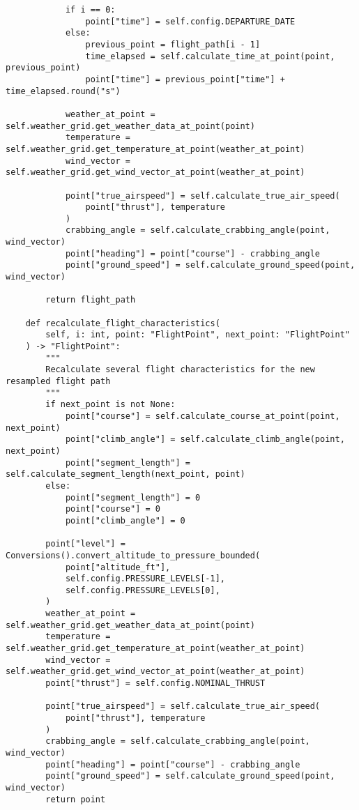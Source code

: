 \begin{verbatim}
            if i == 0:
                point["time"] = self.config.DEPARTURE_DATE
            else:
                previous_point = flight_path[i - 1]
                time_elapsed = self.calculate_time_at_point(point, previous_point)
                point["time"] = previous_point["time"] + time_elapsed.round("s")

            weather_at_point = self.weather_grid.get_weather_data_at_point(point)
            temperature = self.weather_grid.get_temperature_at_point(weather_at_point)
            wind_vector = self.weather_grid.get_wind_vector_at_point(weather_at_point)

            point["true_airspeed"] = self.calculate_true_air_speed(
                point["thrust"], temperature
            )
            crabbing_angle = self.calculate_crabbing_angle(point, wind_vector)
            point["heading"] = point["course"] - crabbing_angle
            point["ground_speed"] = self.calculate_ground_speed(point, wind_vector)

        return flight_path

    def recalculate_flight_characteristics(
        self, i: int, point: "FlightPoint", next_point: "FlightPoint"
    ) -> "FlightPoint":
        """
        Recalculate several flight characteristics for the new resampled flight path
        """
        if next_point is not None:
            point["course"] = self.calculate_course_at_point(point, next_point)
            point["climb_angle"] = self.calculate_climb_angle(point, next_point)
            point["segment_length"] = self.calculate_segment_length(next_point, point)
        else:
            point["segment_length"] = 0
            point["course"] = 0
            point["climb_angle"] = 0

        point["level"] = Conversions().convert_altitude_to_pressure_bounded(
            point["altitude_ft"],
            self.config.PRESSURE_LEVELS[-1],
            self.config.PRESSURE_LEVELS[0],
        )
        weather_at_point = self.weather_grid.get_weather_data_at_point(point)
        temperature = self.weather_grid.get_temperature_at_point(weather_at_point)
        wind_vector = self.weather_grid.get_wind_vector_at_point(weather_at_point)
        point["thrust"] = self.config.NOMINAL_THRUST

        point["true_airspeed"] = self.calculate_true_air_speed(
            point["thrust"], temperature
        )
        crabbing_angle = self.calculate_crabbing_angle(point, wind_vector)
        point["heading"] = point["course"] - crabbing_angle
        point["ground_speed"] = self.calculate_ground_speed(point, wind_vector)
        return point


\end{verbatim}

